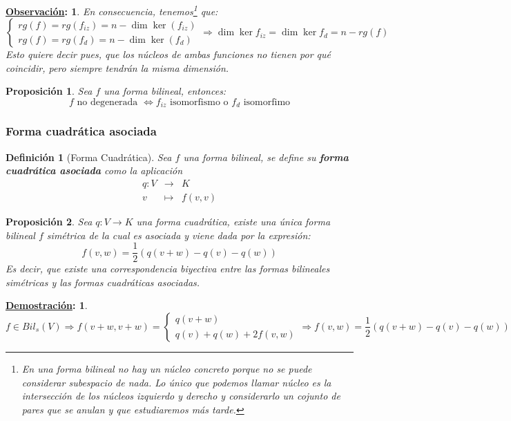 \documentclass[10pt,a4paper,openright]{book}
\theoremstyle{break}
\newtheorem*{defi}{Definición}
\newtheorem*{prop}{Proposición}
\newtheorem*{demo}{\underline{Demostración}:}
\newtheorem*{obs}{\underline{Observación}:}
\begin{document}
\begin{obs}
En consecuencia, tenemos\footnote{En una forma bilineal no hay un núcleo concreto porque no se puede considerar subespacio de nada. Lo único que podemos llamar núcleo es la intersección de los núcleos izquierdo y derecho y considerarlo un cojunto de pares que se anulan y que estudiaremos más tarde.} que:
$$\begin{cases} rg(f) = rg(f_{iz}) = n - \dim \ker(f_{iz}) \\ rg(f) = rg(f_{d}) = n - \dim \ker(f_{d})  \end{cases}\Rightarrow \dim \ker f_{iz} = \dim \ker f_d = n - rg(f)$$
Esto quiere decir pues, que los núcleos de ambas funciones no tienen por qué coincidir, pero siempre tendrán la misma dimensión.
\end{obs}

\begin{prop}
Sea $f$ una forma bilineal, entonces:
$$f \mbox{ no degenerada }\Leftrightarrow f_{iz} \mbox{ isomorfismo o }f_{d} \mbox{ isomorfimo}$$
\end{prop}

\subsubsection{Forma cuadrática asociada}
\begin{defi}[Forma Cuadrática]
Sea $f$ una forma bilineal, se define su \textbf{forma cuadrática asociada} como la aplicación
\begin{eqnarray*}
q:V &\longrightarrow& K \\ v &\longmapsto& f(v,v) 
\end{eqnarray*}
\end{defi}

\begin{prop}
Sea $q: V\rightarrow K$ una forma cuadrática, existe una única forma bilineal $f$ simétrica de la cual es asociada y viene dada por la expresión:
$$ f(v,w) = \frac{1}{2}\left( q (v+w) -q(v)-q(w)\right)$$
Es decir, que existe una correspondencia biyectiva entre las formas bilineales simétricas y las formas cuadráticas asociadas.
\end{prop}
\begin{demo}
$$f\in Bil_s(V)\Rightarrow f(v+w,v+w)=\begin{cases} q(v+w) \\ q(v)+q(w)+2f(v,w)\end{cases}\Rightarrow f(v,w) = \frac{1}{2}\left( q (v+w) -q(v)-q(w)\right)$$
\end{demo}
\end{document}
